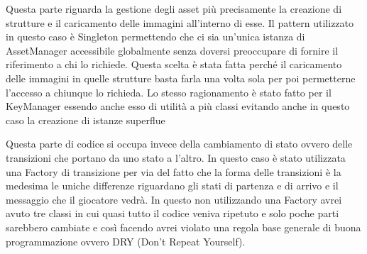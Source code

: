 \documentclass[a4paper,12pt]{report}
\begin{document}
    \par Questa parte riguarda la gestione degli asset più precisamente la creazione di strutture e il caricamento delle
    immagini all’interno di esse. Il pattern utilizzato in questo caso è Singleton permettendo che ci sia un'unica istanza
    di AssetManager accessibile globalmente senza doversi preoccupare di fornire il riferimento a chi lo richiede.
    Questa scelta è stata fatta perché il caricamento delle immagini in quelle strutture basta farla una volta sola per poi
    permetterne l’accesso a chiunque lo richieda. Lo stesso ragionamento è stato fatto per il KeyManager essendo anche esso
    di utilità a più classi evitando anche in questo caso la creazione di istanze superflue
    \par
    \par Questa parte di codice si occupa invece della cambiamento di stato ovvero delle transizioni che portano da uno stato
    a l’altro. In questo caso è stato utilizzata una Factory di transizione per via del fatto che la forma delle transizioni
    è la medesima  le uniche differenze riguardano gli stati di partenza e di arrivo e il messaggio che il giocatore vedrà.
    In questo non utilizzando una Factory avrei avuto tre classi in cui quasi tutto il codice veniva ripetuto e solo poche
    parti sarebbero cambiate  e così facendo avrei violato una regola base generale di buona programmazione ovvero
    DRY (Don’t Repeat Yourself).
    \par
\end{document}
